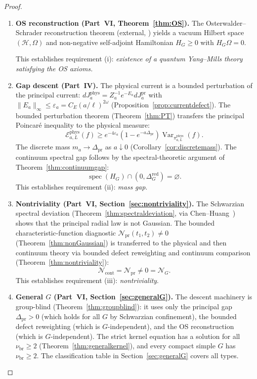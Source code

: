 \documentclass[12pt]{article}
\theoremstyle{plain}
\theoremstyle{definition}
\numberwithin{equation}{section}
\newcommand{\Var}{\operatorname{Var}}
\newcommand{\spec}{\operatorname{spec}}
\newcommand{\pr}{\mathrm{pr}}
\newcommand{\phys}{\mathrm{phys}}
\newcommand{\red}{\mathrm{red}}
\newcommand{\br}{\mathrm{br}}
\begin{document}
\begin{proof}
\begin{enumerate}[label=\textbf{Step~\arabic*.}]
\item \textbf{OS reconstruction (Part~VI, Theorem~\ref{thm:OS}).}
The Osterwalder--Schrader reconstruction theorem (external, \cite{OsterwalderSchrader}) yields a vacuum Hilbert space $(\mathcal{H},\Omega)$ and non-negative self-adjoint Hamiltonian $H_G\geq 0$ with $H_G\Omega=0$.

This establishes requirement (i): \emph{existence of a quantum Yang--Mills theory satisfying the OS axioms.}

\item \textbf{Gap descent (Part~IV).}
The physical current is a bounded perturbation of the principal current: $dJ_a^{\phys}=Z_a^{-1}e^{-E_a}dJ_a^{\pr}$ with $\|E_a\|_\infty\leq\varepsilon_a=C_E(a/\ell)^{2\omega}$ (Proposition~\ref{prop:currentdefect}).  The bounded perturbation theorem (Theorem~\ref{thm:PT}) transfers the principal Poincar\'e inequality to the physical measure:
\begin{equation}
\mathcal{E}_{a,L}^{\phys}(f)\geq e^{-4\varepsilon_a}(1-e^{-a\Delta_{\pr}})\Var_{\pi_{a,L}^{\phys}}(f).
\end{equation}
The discrete mass $m_a\to\Delta_{\pr}$ as $a\downarrow 0$ (Corollary~\ref{cor:discretemass}).  The continuum spectral gap follows by the spectral-theoretic argument of Theorem~\ref{thm:continuumgap}:
\begin{equation}
\spec(H_G)\cap(0,\Delta_G^{\red})=\varnothing.
\end{equation}
This establishes requirement (ii): \emph{mass gap}.

\item \textbf{Nontriviality (Part~VI, Section~\ref{sec:nontriviality}).}
The Schwarzian spectral deviation (Theorem~\ref{thm:spectraldeviation}, via Chen--Huang~\cite{ChenHuang2012}) shows that the principal radial law is not Gaussian.  The bounded characteristic-function diagnostic $\mathcal{N}_{\pr}(t_1,t_2)\neq 0$ (Theorem~\ref{thm:nonGaussian}) is transferred to the physical and then continuum theory via bounded defect reweighting and continuum comparison (Theorem~\ref{thm:nontriviality}):
\begin{equation}
\mathcal{N}_{\mathrm{cont}}=\mathcal{N}_{\pr}\neq 0=\mathcal{N}_G.
\end{equation}
This establishes requirement (iii): \emph{nontriviality}.

\item \textbf{General $G$ (Part~VI, Section~\ref{sec:generalG}).}
The descent machinery is group-blind (Theorem~\ref{thm:groupblind}): it uses only the principal gap $\Delta_{\pr}>0$ (which holds for all $G$ by Schwarzian confinement), the bounded defect reweighting (which is $G$-independent), and the OS reconstruction (which is $G$-independent).  The strict kernel equation has a solution for all $\nu_{\br}\geq 2$ (Theorem~\ref{thm:generalkernel}), and every compact simple $G$ has $\nu_{\br}\geq 2$.  The classification table in Section~\ref{sec:generalG} covers all types.


\end{enumerate}
\end{proof}
\end{document}
